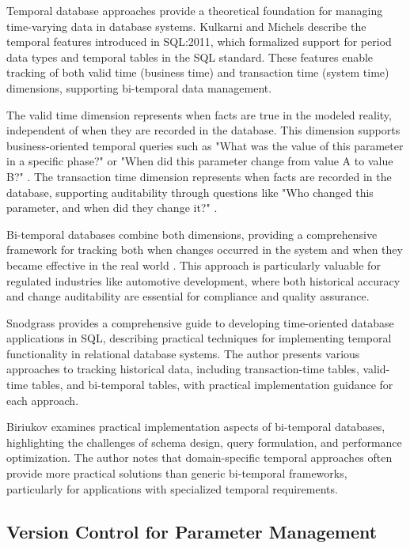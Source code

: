 Temporal database approaches provide a theoretical foundation for managing time-varying data in database systems. Kulkarni and Michels \cite{kulkarni2012temporal} describe the temporal features introduced in SQL:2011, which formalized support for period data types and temporal tables in the SQL standard. These features enable tracking of both valid time (business time) and transaction time (system time) dimensions, supporting bi-temporal data management.

The valid time dimension represents when facts are true in the modeled reality, independent of when they are recorded in the database. This dimension supports business-oriented temporal queries such as "What was the value of this parameter in a specific phase?" or "When did this parameter change from value A to value B?" \cite{bohlen2018database}. The transaction time dimension represents when facts are recorded in the database, supporting auditability through questions like "Who changed this parameter, and when did they change it?" \cite{kulkarni2012temporal}.

Bi-temporal databases combine both dimensions, providing a comprehensive framework for tracking both when changes occurred in the system and when they became effective in the real world \cite{bohlen2018database}. This approach is particularly valuable for regulated industries like automotive development, where both historical accuracy and change auditability are essential for compliance and quality assurance.

Snodgrass \cite{snodgrass1999developing} provides a comprehensive guide to developing time-oriented database applications in SQL, describing practical techniques for implementing temporal functionality in relational database systems. The author presents various approaches to tracking historical data, including transaction-time tables, valid-time tables, and bi-temporal tables, with practical implementation guidance for each approach.

Biriukov \cite{biriukov2018implementation} examines practical implementation aspects of bi-temporal databases, highlighting the challenges of schema design, query formulation, and performance optimization. The author notes that domain-specific temporal approaches often provide more practical solutions than generic bi-temporal frameworks, particularly for applications with specialized temporal requirements.

\subsection{Version Control for Parameter Management}
\label{subsec:version-control-parameter-management}

